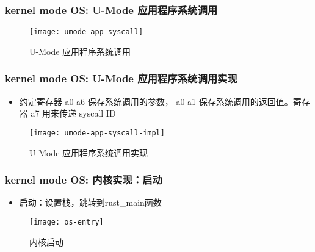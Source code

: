 \begin{frame}
    \frametitle{kernel mode OS: U-Mode 应用程序系统调用}
%        
%        
%        
    \begin{figure}
        \centering
        \texttt{[image: umode-app-syscall]}
        \caption{U-Mode 应用程序系统调用}
    \end{figure}
\end{frame}
\begin{frame}
    \frametitle{kernel mode OS: U-Mode 应用程序系统调用实现}
        \begin{itemize}
            
            \item 约定寄存器 a0-a6 保存系统调用的参数， a0-a1 保存系统调用的返回值。寄存器 a7 用来传递 syscall ID
            
        \end{itemize}	
    \begin{figure}
        \centering
        \texttt{[image: umode-app-syscall-impl]}
        \caption{U-Mode 应用程序系统调用实现}
    \end{figure}
\end{frame}
\begin{frame}
    \frametitle{kernel mode OS: 内核实现：启动}
    \begin{itemize}
        
        \item 启动：设置栈，跳转到rust\_main函数
        
    \end{itemize}	
    \begin{figure}
        \centering
        \texttt{[image: os-entry]}
        \caption{内核启动}
    \end{figure}
\end{frame}

